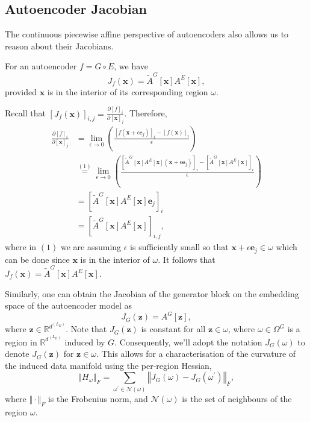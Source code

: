 \subsection{Autoencoder Jacobian}

The continuous piecewise affine perspective of autoencoders also allows us to reason about their Jacobians. 

\begin{proposition}
    For an autoencoder $f=G\circ E$, we have $$J_f(\mathbf{x})=\tilde{A}^G[\mathbf{x}]A^E[\mathbf{x}],$$provided $\mathbf{x}$ is in the interior of its corresponding region $\omega$.
\end{proposition}

\begin{tproof}
    Recall that $\left[J_f(\mathbf{x})\right]_{i,j}=\frac{\partial[f]_i}{\partial[\mathbf{x}]_j}$. Therefore,
    \begin{align*}
        \frac{\partial[f]_i}{\partial[\mathbf{x}]_j}&=\lim_{\epsilon\to0}\left(\frac{\left[f\left(\mathbf{x}+\epsilon\mathbf{e}_j\right)\right]_i-\left[f(\mathbf{x})\right]_i}{\epsilon}\right)\\&\overset{(1)}{=}\lim_{\epsilon\to0}\left(\frac{\left[\tilde{A}^G[\mathbf{x}]A^E[\mathbf{x}]\left(\mathbf{x}+\epsilon\mathbf{e}_j\right)\right]_i-\left[\tilde{A}^G[\mathbf{x}]A^E[\mathbf{x}]\right]_i}{\epsilon}\right)\\&=\left[\tilde{A}^G[\mathbf{x}]A^E[\mathbf{x}]\mathbf{e}_j\right]_i\\&=\left[\tilde{A}^G[\mathbf{x}]A^E[\mathbf{x}]\right]_{i,j},
    \end{align*}
    where in $(1)$ we are assuming $\epsilon$ is sufficiently small so that $\mathbf{x}+\epsilon\mathbf{e}_j\in\omega$ which can be done since $\mathbf{x}$ is in the interior of $\omega$. It follows that $J_f(\mathbf{x})=\tilde{A}^G[\mathbf{x}]A^E[\mathbf{x}]$.
\end{tproof}

Similarly, one can obtain the Jacobian of the generator block on the embedding space of the autoencoder model as $$J_{G}(\mathbf{z})=A^G[\mathbf{z}],$$where $\mathbf{z}\in\mathbb{R}^{d^{\left(L_E\right)}}$. Note that $J_G(\mathbf{z})$ is constant for all $\mathbf{z}\in\omega$, where $\omega\in\Omega^G$ is a region in $\mathbb{R}^{d^{\left(L_E\right)}}$ induced by $G$. Consequently, we'll adopt the notation $J_G(\omega)$ to denote $J_G(\mathbf{z})$ for $\mathbf{z}\in\omega$. This allows for a characterisation of the curvature of the induced data manifold using the per-region Hessian, $$\left\Vert H_{\omega}\right\Vert_F=\sum_{\omega^\prime\in\mathcal{N}(\omega)}\left\Vert J_G(\omega)-J_G\left(\omega^\prime\right)\right\Vert_F,$$where $\Vert\cdot\Vert_F$ is the Frobenius norm, and $\mathcal{N}(\omega)$ is the set of neighbours of the region $\omega$.

